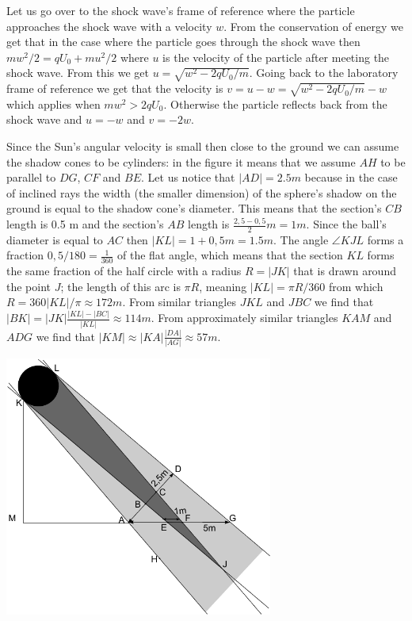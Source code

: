 \documentclass[11pt]{article}
\begin{document}

\solueng
Let us go over to the shock wave's frame of reference where the particle approaches the shock wave with a velocity $w$. From the conservation of energy we get that in the case where the particle goes through the shock wave then $mw^2/2=qU_0+mu^2/2$ where $u$ is the velocity of the particle after meeting the shock wave. From this we get $u=\sqrt{w^2-2qU_0/m}$. Going back to the laboratory frame of reference we get that the velocity is $v=u-w=\sqrt{w^2-2qU_0/m}-w$ which applies when $mw^2>2qU_0$. Otherwise the particle reflects back from the shock wave and $u=-w$ and $v=-2w$.
\probend
\bigskip


\solueng
Since the Sun's angular velocity is small then close to the ground we can assume the shadow cones to be cylinders: in the figure it means that we assume $AH$ to be parallel to $DG$, $CF$ and $BE$. Let us notice that $|AD|=\SI{2,5}m$ because in the case of inclined rays the width (the smaller dimension) of the sphere's shadow on the ground is equal to the shadow cone's diameter. This means that the section's $CB$ length is 0.5 m and the section's $AB$ length is $\frac{2,5-0,5}2\SI{}m=\SI{1}m$. Since the ball's diameter is equal to $AC$ then $|KL|=1+0,5\SI{}m=\SI{1,5}m$. The angle $\angle KJL$ forms a fraction $0,5/180=\frac 1{360}$ of the flat angle, which means that the section $KL$ forms the same fraction of the half circle with a radius $R=|JK|$ that is drawn around the point $J$; the length of this arc is $\pi R$, meaning $|KL|=\pi R /360$ from which $R=360|KL|/\pi\approx \SI{172}m$. From similar triangles $JKL$ and $JBC$ we find that $|BK|=|JK|\frac{|KL|-|BC|}{|KL|}\approx \SI{114}m$. From approximately similar triangles $KAM$ and $ADG$ we find that $|KM|\approx |KA|\frac{|DA|}{|AG|}\approx \SI{57}m$.
\begin{center}
\includegraphics[width=250pt]{2013-lahg-10-pxike-pall-vari}%
\end{center}
\probend
\bigskip
\end{document}
